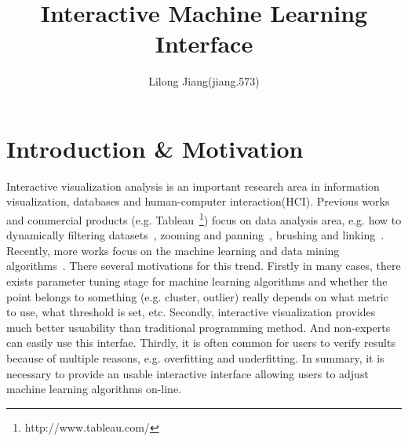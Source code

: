 \documentclass{article}
\begin{document}
	
\title{Interactive Machine Learning Interface}
\author{Lilong Jiang(jiang.573)}
\date{}
\maketitle

\section{Introduction \& Motivation}
Interactive visualization analysis is an important research area in information visualization, databases and human-computer interaction(HCI). Previous works and commercial products (e.g. Tableau~\footnote{http://www.tableau.com/‎}) focus on data analysis area, e.g. how to dynamically filtering datasets~\cite{ahlberg1992dynamic, goldstein1994using}, zooming and panning~\cite{rao1994table}, brushing and linking~\cite{doleisch2002smooth, hauser2002angular}. Recently, more works focus on the machine learning and data mining algorithms~\cite{crotty2015vizdom, wu2013scorpion, packer2013visual, turkay2011interactive}. There several motivations for this trend. Firstly in many cases, there exists parameter tuning stage for machine learning algorithms and whether the point belongs to something (e.g. cluster, outlier) really depends on what metric to use, what threshold is set, etc. Secondly, interactive visualization provides much better usuability than traditional programming method. And non-experts can easily use this interfae. Thirdly, it is often common for users to verify results because of multiple reasons, e.g. overfitting and underfitting. In summary, it is necessary to provide an usable interactive interface allowing users to adjust machine learning algorithms on-line.
\end{document}
